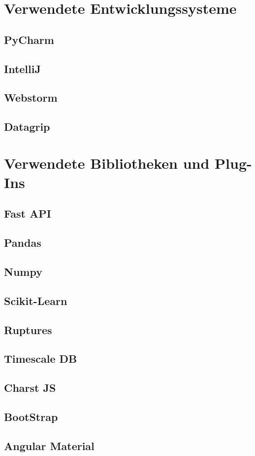 \documentclass[pdftex,11pt,a4paper,oneside]{book}
\begin{document}
\section{Verwendete Entwicklungssysteme}
\subsection{PyCharm}
\subsection{IntelliJ}
\subsection{Webstorm}
\subsection{Datagrip}
\section{Verwendete Bibliotheken und Plug-Ins}
\subsection{Fast API}
\subsection{Pandas}
\subsection{Numpy}
\subsection{Scikit-Learn}
\subsection{Ruptures}
\subsection{Timescale DB}
\subsection{Charst JS}
\subsection{BootStrap}
\subsection{Angular Material}
\end{document}
